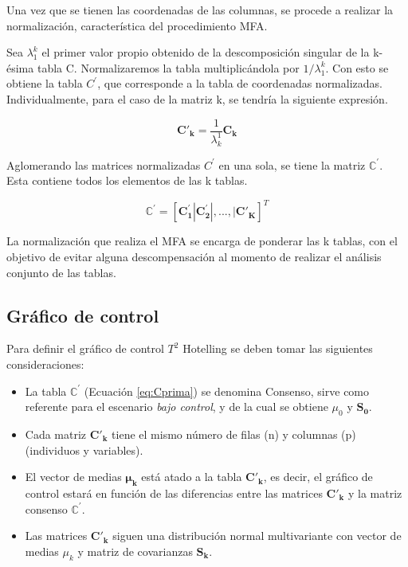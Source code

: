 \documentclass[water,article,submit,moreauthors,pdftex]{mdpi}
\providecommand{\tightlist}{%
  \setlength{\itemsep}{0pt}\setlength{\parskip}{4pt}}
\begin{document}
Una vez que se tienen las coordenadas de las columnas, se procede a
realizar la normalización, característica del procedimiento MFA.

Sea \(\lambda_{1}^{k}\) el primer valor propio obtenido de la
descomposición singular de la k-ésima tabla C. Normalizaremos la tabla
multiplicándola por \(1/\lambda_{1}^{k}\). Con esto se obtiene la tabla
\(C^{'}\), que corresponde a la tabla de coordenadas normalizadas.\\
Individualmente, para el caso de la matriz k, se tendría la siguiente
expresión.

\begin{equation}
\mathbf{C'_k}=\frac{1}{\lambda_{k}^1} \mathbf{C_k}
\label{eq:Cprimak}
\end{equation}

Aglomerando las matrices normalizadas \(C^{'}\) en una sola, se tiene la
matriz \(\mathbb{C}^{'}\). Esta contiene todos los elementos de las k
tablas.

\begin{equation}
\mathbf{\mathbb{C^{'}}}=[\mathbf{C_1^{'}}|\mathbf{C_2^{'}}|,...,|\mathbf{C'_{K}}]^{T}
\label{eq:Cprima}
\end{equation}

La normalización que realiza el MFA se encarga de ponderar las k tablas,
con el objetivo de evitar alguna descompensación al momento de realizar
el análisis conjunto de las tablas.

\hypertarget{gruxe1fico-de-control}{%
\subsection{Gráfico de control}\label{gruxe1fico-de-control}}

Para definir el gráfico de control \(T^2\) Hotelling se deben tomar las
siguientes consideraciones:

\begin{itemize}
\tightlist
\item
  La tabla \(\mathbb{C}^{'}\) (Ecuación \ref{eq:Cprima}) se denomina
  Consenso, sirve como referente para el escenario \emph{bajo control},
  y de la cual se obtiene \(\mu_{0}\) y \(\mathbf{S_0}\).\\
\item
  Cada matriz \(\mathbf{C'_k}\) tiene el mismo número de filas (n) y
  columnas (p) (individuos y variables).
\item
  El vector de medias \(\mathbf{\mu_k}\) está atado a la tabla
  \(\mathbf{C'_k}\), es decir, el gráfico de control estará en función
  de las diferencias entre las matrices \(\mathbf{C'_k}\) y la matriz
  consenso \(\mathbf{\mathbb{C^{'}}}\).
\item
  Las matrices \(\mathbf{C'_k}\) siguen una distribución normal
  multivariante con vector de medias \(\mu_{k}\) y matriz de covarianzas
  \(\mathbf{S_k}\).
\end{itemize}
\end{document}
